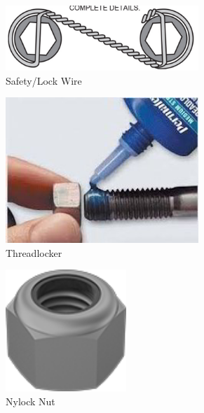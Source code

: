 \documentclass[10pt,letterpaper]{book}
\begin{document}
	\begin{figure}[H]
		\centering
		\begin{subfigure}[b]{.24\linewidth}
			\includegraphics[width=0.8\textwidth]{imgs/lockwire.png}
			\caption{Safety/Lock Wire}
		\end{subfigure}\begin{subfigure}[b]{.24\linewidth}
			\includegraphics[width=0.8\textwidth]{imgs/threadlocker.jpeg}
			\caption{Threadlocker}
		\end{subfigure}\begin{subfigure}[b]{.24\linewidth}
			\includegraphics[width=0.5\textwidth]{imgs/nylock.png}
			\caption{Nylock Nut}
		\end{subfigure}\begin{subfigure}[b]{.24\linewidth}

\end{subfigure}
\end{figure}
\end{document}
